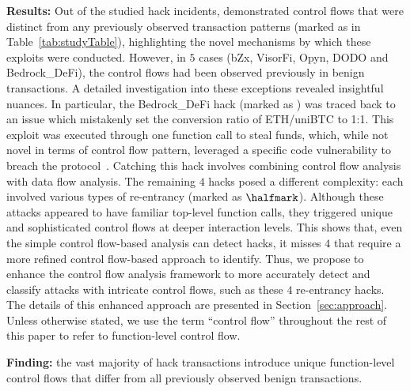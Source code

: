 






\noindent \textbf{Results:}
Out of the  studied hack incidents, 
 demonstrated control flows that
were distinct from any previously observed transaction patterns (marked as
\cmark in Table~\ref{tab:studyTable}), highlighting the novel mechanisms by
which these exploits were conducted. However, in $5$ cases (bZx, VisorFi, 
Opyn, DODO and
Bedrock\_DeFi), the control flows had been observed previously in benign
transactions. A detailed investigation into these exceptions revealed
insightful nuances. In particular, the Bedrock\_DeFi hack
(marked as \xmark) was traced back to an issue which mistakenly set the
conversion ratio of ETH/uniBTC to 1:1. This exploit was executed
through one function call to steal funds, which, while not novel in terms
of control flow pattern, leveraged a specific code vulnerability to 
breach the
protocol~\cite{bedrock2025}. Catching this hack involves
combining control flow analysis with data flow analysis.
The remaining $4$ hacks posed a different complexity: 
each involved various
types of re-entrancy (marked as $\halfmark$). 
Although these attacks appeared to have familiar top-level 
function calls, they triggered unique and sophisticated control 
flows at deeper interaction levels. 
This shows that, even the
simple control flow-based analysis 
can detect  hacks,
it misses $4$ that require a more refined control 
flow-based approach to identify. 
Thus, we propose to enhance the control flow analysis 
framework 
to more accurately detect and classify attacks with 
intricate control flows, 
such as these $4$ re-entrancy hacks. 
The details of this enhanced 
approach are presented in Section~\ref{sec:approach}. 
Unless otherwise stated, 
we use the term ``control flow'' throughout 
the rest of this paper to refer to function-level control flow.

\noindent \textbf{Finding:} 
the vast majority of hack transactions introduce
unique function-level control flows that differ from all 
previously observed benign transactions.


